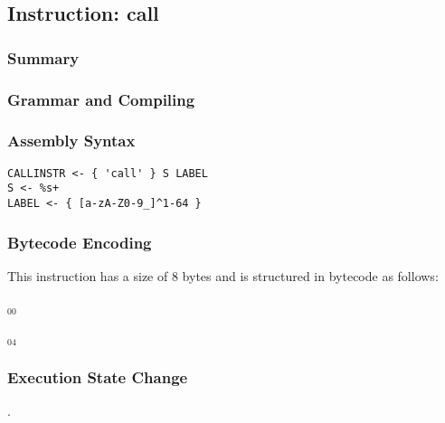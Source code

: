 \subsection{Instruction: call}

\subsubsection{Summary}


\subsubsection{Grammar and Compiling}


\subsubsection{Assembly Syntax}

\begin{myquote}
\begin{verbatim}
CALLINSTR <- { 'call' } S LABEL
S <- %s+
LABEL <- { [a-zA-Z0-9_]^1-64 }
\end{verbatim}
\end{myquote}

\subsubsection{Bytecode Encoding}

This instruction has a size of 8 bytes and is structured in bytecode as follows:

$_{00}$\ 



$_{04}$\ 


\subsubsection{Execution State Change}

.


